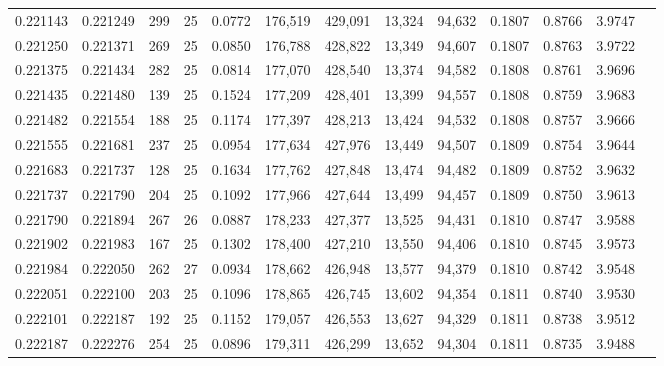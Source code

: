 \begin{tabular}{rrrrrrrrrrrrr}
0.221143 & 0.221249 &   299 &  25 &                                     0.0772 & 176,519 & 429,091 &  13,324 &  94,632 & 0.1807 & 0.8766 & 3.9747 \\
0.221250 & 0.221371 &   269 &  25 &                                     0.0850 & 176,788 & 428,822 &  13,349 &  94,607 & 0.1807 & 0.8763 & 3.9722 \\
0.221375 & 0.221434 &   282 &  25 &                                     0.0814 & 177,070 & 428,540 &  13,374 &  94,582 & 0.1808 & 0.8761 & 3.9696 \\
0.221435 & 0.221480 &   139 &  25 &                                     0.1524 & 177,209 & 428,401 &  13,399 &  94,557 & 0.1808 & 0.8759 & 3.9683 \\
0.221482 & 0.221554 &   188 &  25 &                                     0.1174 & 177,397 & 428,213 &  13,424 &  94,532 & 0.1808 & 0.8757 & 3.9666 \\
0.221555 & 0.221681 &   237 &  25 &                                     0.0954 & 177,634 & 427,976 &  13,449 &  94,507 & 0.1809 & 0.8754 & 3.9644 \\
0.221683 & 0.221737 &   128 &  25 &                                     0.1634 & 177,762 & 427,848 &  13,474 &  94,482 & 0.1809 & 0.8752 & 3.9632 \\
0.221737 & 0.221790 &   204 &  25 &                                     0.1092 & 177,966 & 427,644 &  13,499 &  94,457 & 0.1809 & 0.8750 & 3.9613 \\
0.221790 & 0.221894 &   267 &  26 &                                     0.0887 & 178,233 & 427,377 &  13,525 &  94,431 & 0.1810 & 0.8747 & 3.9588 \\
0.221902 & 0.221983 &   167 &  25 &                                     0.1302 & 178,400 & 427,210 &  13,550 &  94,406 & 0.1810 & 0.8745 & 3.9573 \\
0.221984 & 0.222050 &   262 &  27 &                                     0.0934 & 178,662 & 426,948 &  13,577 &  94,379 & 0.1810 & 0.8742 & 3.9548 \\
0.222051 & 0.222100 &   203 &  25 &                                     0.1096 & 178,865 & 426,745 &  13,602 &  94,354 & 0.1811 & 0.8740 & 3.9530 \\
0.222101 & 0.222187 &   192 &  25 &                                     0.1152 & 179,057 & 426,553 &  13,627 &  94,329 & 0.1811 & 0.8738 & 3.9512 \\
0.222187 & 0.222276 &   254 &  25 &                                     0.0896 & 179,311 & 426,299 &  13,652 &  94,304 & 0.1811 & 0.8735 & 3.9488 \\

\end{tabular}

